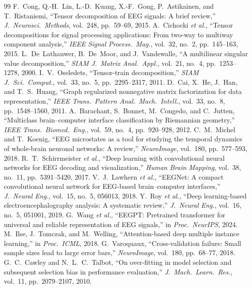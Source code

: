 \documentclass[10pt,twocolumn,a4paper]{article}
\begin{document}
\begin{thebibliography}{99}
 F.~Cong, Q.-H.~Lin, L.-D.~Kuang, X.-F.~Gong, P.~Astikainen, and T.~Ristaniemi, ``Tensor decomposition of EEG signals: A brief review,'' \emph{J.\ Neurosci.\ Methods}, vol.~248, pp.~59--69, 2015.
 A.~Cichocki \emph{et al.}, ``Tensor decompositions for signal processing applications: From two-way to multiway component analysis,'' \emph{IEEE Signal Process.\ Mag.}, vol.~32, no.~2, pp.~145--163, 2015.
 L.~De~Lathauwer, B.~De~Moor, and J.~Vandewalle, ``A multilinear singular value decomposition,'' \emph{SIAM J.\ Matrix Anal.\ Appl.}, vol.~21, no.~4, pp.~1253--1278, 2000.
 I.~V.~Oseledets, ``Tensor-train decomposition,'' \emph{SIAM J.\ Sci.\ Comput.}, vol.~33, no.~5, pp.~2295--2317, 2011.
 D.~Cai, X.~He, J.~Han, and T.~S.~Huang, ``Graph regularized nonnegative matrix factorization for data representation,'' \emph{IEEE Trans.\ Pattern Anal.\ Mach.\ Intell.}, vol.~33, no.~8, pp.~1548--1560, 2011.
 A.~Barachant, S.~Bonnet, M.~Congedo, and C.~Jutten, ``Multiclass brain--computer interface classification by Riemannian geometry,'' \emph{IEEE Trans.\ Biomed.\ Eng.}, vol.~59, no.~4, pp.~920--928, 2012.
 C.~M.~Michel and T.~Koenig, ``EEG microstates as a tool for studying the temporal dynamics of whole-brain neuronal networks: A review,'' \emph{NeuroImage}, vol.~180, pp.~577--593, 2018.
 R.~T.~Schirrmeister \emph{et al.}, ``Deep learning with convolutional neural networks for EEG decoding and visualization,'' \emph{Human Brain Mapping}, vol.~38, no.~11, pp.~5391--5420, 2017.
 V.~J.~Lawhern \emph{et al.}, ``EEGNet: A compact convolutional neural network for EEG-based brain--computer interfaces,'' \emph{J.\ Neural Eng.}, vol.~15, no.~5, 056013, 2018.
 Y.~Roy \emph{et al.}, ``Deep learning-based electroencephalography analysis: A systematic review,'' \emph{J.\ Neural Eng.}, vol.~16, no.~5, 051001, 2019.
 G.~Wang \emph{et al.}, ``EEGPT: Pretrained transformer for universal and reliable representation of EEG signals,'' in \emph{Proc.\ NeurIPS}, 2024.
 M.~Ilse, J.~Tomczak, and M.~Welling, ``Attention-based deep multiple instance learning,'' in \emph{Proc.\ ICML}, 2018.
 G.~Varoquaux, ``Cross-validation failure: Small sample sizes lead to large error bars,'' \emph{NeuroImage}, vol.~180, pp.~68--77, 2018.
 G.~C.~Cawley and N.~L.~C.~Talbot, ``On over-fitting in model selection and subsequent selection bias in performance evaluation,'' \emph{J.\ Mach.\ Learn.\ Res.}, vol.~11, pp.~2079--2107, 2010.

\end{thebibliography}
\end{document}
